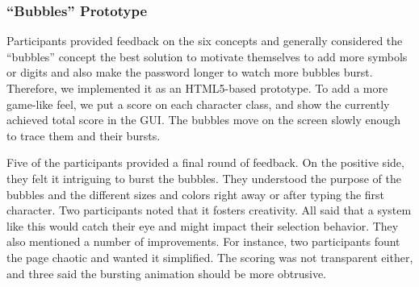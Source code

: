 \subsubsection{``Bubbles'' Prototype}
Participants provided feedback on the six concepts and generally considered the ``bubbles'' concept the best solution to motivate themselves to add more symbols or digits and also make the password longer to watch more bubbles burst. Therefore, we implemented it as an HTML5-based prototype. To add a more game-like feel, we put a score on each character class, and show the currently achieved total score in the GUI. The bubbles move on the screen slowly enough to trace them and their bursts. 

Five of the participants provided a final round of feedback. On the positive side, they felt it intriguing to burst the bubbles. They understood the purpose of the bubbles and the different sizes and colors right away or after typing the first character. Two participants noted that it fosters creativity. All said that a system like this would catch their eye and might impact their selection behavior. They also mentioned a number of improvements. For instance, two participants fount the page chaotic and wanted it simplified. The scoring was not transparent either, and three said the bursting animation should be more obtrusive. 

